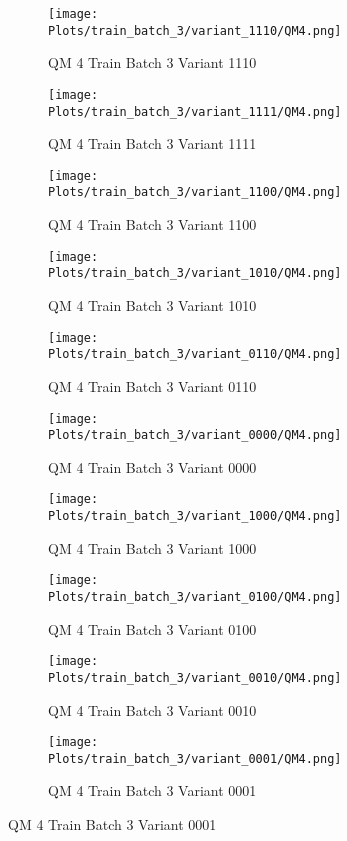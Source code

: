 \documentclass{DissertateFigs}
\begin{document}
\begin{figure}[t!]
    \begin{subfigure}{0.47\textwidth}
    \texttt{[image: Plots/train\_batch\_3/variant\_1110/QM4.png]}
    \caption{QM 4 Train Batch 3 Variant 1110}
    \end{subfigure}
    \begin{subfigure}{0.47\textwidth}
    \texttt{[image: Plots/train\_batch\_3/variant\_1111/QM4.png]}
    \caption{QM 4 Train Batch 3 Variant 1111}
    \end{subfigure}

\medskip

    \begin{subfigure}{0.47\textwidth}
    \texttt{[image: Plots/train\_batch\_3/variant\_1100/QM4.png]}
    \caption{QM 4 Train Batch 3 Variant 1100}
    \end{subfigure}
    \begin{subfigure}{0.47\textwidth}
    \texttt{[image: Plots/train\_batch\_3/variant\_1010/QM4.png]}
    \caption{QM 4 Train Batch 3 Variant 1010}
    \end{subfigure}

\medskip

    \begin{subfigure}{0.47\textwidth}
    \texttt{[image: Plots/train\_batch\_3/variant\_0110/QM4.png]}
    \caption{QM 4 Train Batch 3 Variant 0110}
    \end{subfigure}
    \begin{subfigure}{0.47\textwidth}
    \texttt{[image: Plots/train\_batch\_3/variant\_0000/QM4.png]}
    \caption{QM 4 Train Batch 3 Variant 0000}
    \end{subfigure}

\medskip

    \begin{subfigure}{0.47\textwidth}
    \texttt{[image: Plots/train\_batch\_3/variant\_1000/QM4.png]}
    \caption{QM 4 Train Batch 3 Variant 1000}
    \end{subfigure}
    \begin{subfigure}{0.47\textwidth}
    \texttt{[image: Plots/train\_batch\_3/variant\_0100/QM4.png]}
    \caption{QM 4 Train Batch 3 Variant 0100}
    \end{subfigure}

\medskip

    \begin{subfigure}{0.47\textwidth}
    \texttt{[image: Plots/train\_batch\_3/variant\_0010/QM4.png]}
    \caption{QM 4 Train Batch 3 Variant 0010}
    \end{subfigure}
    \begin{subfigure}{0.47\textwidth}
    \texttt{[image: Plots/train\_batch\_3/variant\_0001/QM4.png]}
    \caption{QM 4 Train Batch 3 Variant 0001}
    \end{subfigure}


\end{figure}
\end{document}
